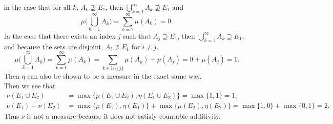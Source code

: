 \begin{enumerate}
	in the case that for all $k$, $A_k\not\supseteq E_1$, then $\bigcup_{k=1}^\infty A_k\not\supseteq E_1$ and 
	\[
		\mu\biggl(\bigcup_{k=1}^\infty A_k\biggr)=\sum_{k=1}^\infty\mu(A_k)=0.
	\]
	In the case that there exists an index $j$ such that $A_j\supseteq E_1$, then $\bigcup_{k=1}^\infty A_k\supseteq E_1$, and because the sets are disjoint, $A_i\not\supseteq E_1$ for $i\neq j$.
	\[
		\mu\biggl(\bigcup_{k=1}^\infty A_k\biggr)=\sum_{k=1}^\infty\mu(A_k)=\sum_{k\in\mathbb{N}\setminus\{j\}}\mu(A_k)+\mu(A_j)=0+\mu(A_j)=1.
	\]
	Then $\eta$ can also be shown to be a measure in the exact same way.
	\\Then we see that
	\begin{align*}
		\nu(E_1\cup E_2)&=\max\{\mu(E_1\cup E_2),\eta(E_1\cup E_2)\}=\max\{1,1\}=1,\\
		\nu(E_1)+\nu(E_2)&=\max\{\mu(E_1),\eta(E_1)\}+\max\{\mu(E_2),\eta(E_2)\}=\max\{1,0\}+\max\{0,1\}=2.
	\end{align*}
	Thus $\nu$ is not a measure because it does not satisfy countable additivity.
\end{enumerate}

